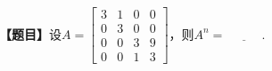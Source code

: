 \documentclass{article}
\begin{document}
{\heiti {} \textbf{【题目】}}设$A=
  \begin{bmatrix}
 3&1&0&0\\
 0&3&0&0\\
 0&0&3&9\\
 0&0&1&3
  \end{bmatrix}
  $，则$A^{n}=\underline{~~~~~~~~~~~~~}.$
\end{document}

